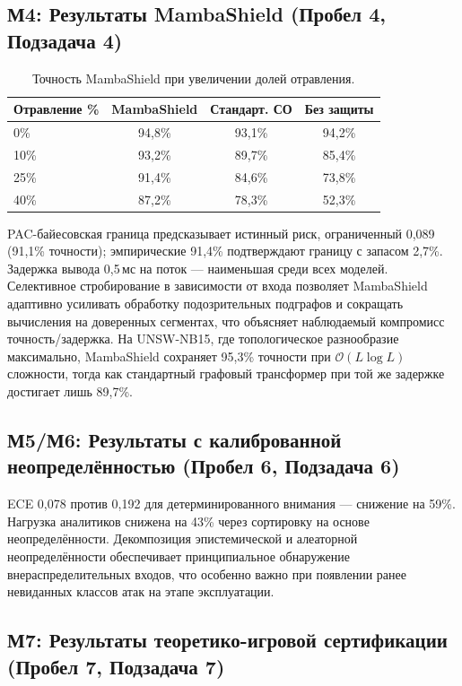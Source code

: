 \subsection{М4: Результаты MambaShield (Пробел 4, Подзадача 4)}

\begin{table}[htbp]\centering\small
\caption{Точность MambaShield при увеличении долей отравления.}
\label{tab:mamba_results}
\renewcommand{\arraystretch}{0.92}\begin{tabular}{lccc}
\toprule
Отравление \% & MambaShield & Стандарт. СО & Без защиты \\
\midrule
0\%  & 94,8\% & 93,1\% & 94,2\% \\
10\% & 93,2\% & 89,7\% & 85,4\% \\
25\% & 91,4\% & 84,6\% & 73,8\% \\
40\% & 87,2\% & 78,3\% & 52,3\% \\
\bottomrule
\end{tabular}\end{table}

PAC-байесовская граница предсказывает истинный риск, ограниченный 0,089 (91,1\% точности); эмпирические 91,4\% подтверждают границу с запасом 2,7\%. Задержка вывода 0,5\,мс на поток --- наименьшая среди всех моделей. Селективное стробирование в зависимости от входа позволяет MambaShield адаптивно усиливать обработку подозрительных подграфов и сокращать вычисления на доверенных сегментах, что объясняет наблюдаемый компромисс точность/задержка. На UNSW-NB15, где топологическое разнообразие максимально, MambaShield сохраняет 95,3\% точности при $\mathcal{O}(L\log L)$ сложности, тогда как стандартный графовый трансформер при той же задержке достигает лишь 89,7\%.

\subsection{М5/М6: Результаты с калиброванной неопределённостью (Пробел 6, Подзадача 6)}

ECE 0,078 против 0,192 для детерминированного внимания --- снижение на 59\%. Нагрузка аналитиков снижена на 43\% через сортировку на основе неопределённости. Декомпозиция эпистемической и алеаторной неопределённости обеспечивает принципиальное обнаружение внераспределительных входов, что особенно важно при появлении ранее невиданных классов атак на этапе эксплуатации.

\subsection{М7: Результаты теоретико-игровой сертификации (Пробел 7, Подзадача 7)}

